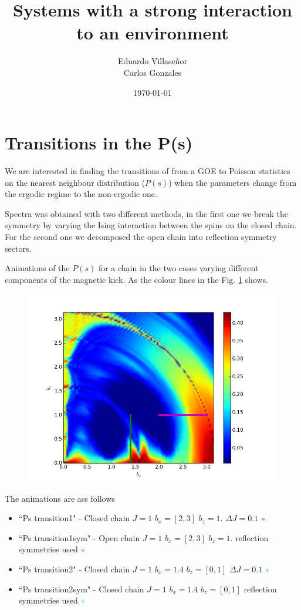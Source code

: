 \documentclass[floatfix]{article}
\title{Systems with a strong interaction to an environment}
\author{Eduardo Villase\~nor \\ Carlos Gonzales}
\date{\today}
\newcommand*{\gd}{
\textcolor{green}{\ast}}
\newcommand*{\md}{
\textcolor{magenta}{\ast}}
\newcommand*{\ud}{
\underline{\space\space}}
\begin{document}
\maketitle



\section{Transitions in the P(s)}

We are interested in finding the transitions of from a GOE to Poisson statistics on the
nearest neighbour distribution ($P(s)$) when the parameters change from the ergodic regime to the non-ergodic 
one.

Spectra was obtained with two different methods, in the first one we break the symmetry by varying the Ising interaction between the
spins on the closed chain. For the second one we decomposed the open chain into reflection symmetry sectors.

Animations of the $P(s)$ for a chain in the two cases varying different components of the magnetic kick. As
the colour lines in the Fig. \ref{anim_gui} shows.

\begin{figure}[H]
\begin{center}
\includegraphics[width=.5\columnwidth]{anim_guide}  
\end{center}
\caption{}
\label{anim_gui}
\end{figure}

The animations are ass follows 
\begin{itemize}
\item ``Ps\ud transition1" - Closed chain $J=1$ $b_x=[2,3]$ $b_z=1.$ $\Delta J = 0.1$ $\md$
\item ``Ps\ud transition1\underline{\space\space}sym" - Open chain $J=1$ $b_x=[2,3]$ $b_z=1.$ reflection symmetries used $\md$
\item ``Ps\ud transition2" - Closed chain $J=1$ $b_x=1.4$ $b_z=[0,1]$ $\Delta J = 0.1$ $\gd$
\item ``Ps\ud transition2\underline{\space\space}sym" - Closed chain $J=1$ $b_x=1.4$ $b_z=[0,1]$ reflection symmetries used $\gd$
\end{itemize}
\end{document}
